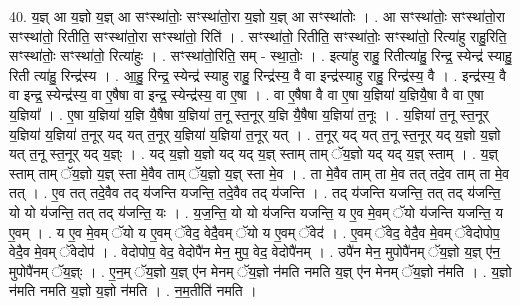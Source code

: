 \documentclass[17pt]{extarticle}
\begin{document}
40. य॒ज्ञ् आ य॒ज्ञो य॒ज्ञ् आ सꣳस्था॑तोः॒ सꣳस्था॑तो॒रा य॒ज्ञो य॒ज्ञ् आ सꣳस्था॑तोः । . आ सꣳस्था॑तोः॒ सꣳस्था॑तो॒रा सꣳस्था॑तो॒ रितीति॒ सꣳस्था॑तो॒रा सꣳस्था॑तो॒ रिति॑ । . सꣳस्था॑तो॒ रितीति॒ सꣳस्था॑तोः॒ सꣳस्था॑तो॒ रित्या॑हु राहु॒रिति॒ सꣳस्था॑तोः॒ सꣳस्था॑तो॒ रित्या॑हुः । . सꣳस्था॑तो॒रिति॒ सम् - स्था॒तोः॒ । . इत्या॑हु राहु॒ रितीत्या॑हु॒ रिन्द्र॒ स्येन्द्र॑ स्याहु॒ रिती त्या॑हु॒ रिन्द्र॑स्य । . आ॒हु॒ रिन्द्र॒ स्येन्द्र॑ स्याहु राहु॒ रिन्द्र॑स्य॒ वै वा इन्द्र॑स्याहु राहु॒ रिन्द्र॑स्य॒ वै । . इन्द्र॑स्य॒ वै वा इन्द्र॒ स्येन्द्र॑स्य॒ वा ए॒षैषा वा इन्द्र॒ स्येन्द्र॑स्य॒ वा ए॒षा । . वा ए॒षैषा वै वा ए॒षा य॒ज्ञिया॑ य॒ज्ञियै॒षा वै वा ए॒षा य॒ज्ञिया᳚ । . ए॒षा य॒ज्ञिया॑ य॒ज्ञि यै॒षैषा य॒ज्ञिया॑ त॒नू स्त॒नूर् य॒ज्ञि यै॒षैषा य॒ज्ञिया॑ त॒नूः । . य॒ज्ञिया॑ त॒नू स्त॒नूर् य॒ज्ञिया॑ य॒ज्ञिया॑ त॒नूर् यद् यत् त॒नूर् य॒ज्ञिया॑ य॒ज्ञिया॑ त॒नूर् यत् । . त॒नूर् यद् यत् त॒नू स्त॒नूर् यद् य॒ज्ञो य॒ज्ञो यत् त॒नू स्त॒नूर् यद् य॒ज्ञ्ः । . यद् य॒ज्ञो य॒ज्ञो यद् यद् य॒ज्ञ् स्ताम् ताम् ॅय॒ज्ञो यद् यद् य॒ज्ञ् स्ताम् । . य॒ज्ञ् स्ताम् ताम् ॅय॒ज्ञो य॒ज्ञ् स्ता मे॒वैव ताम् ॅय॒ज्ञो य॒ज्ञ् स्ता मे॒व । . ता मे॒वैव ताम् ता मे॒व तत् तदे॒व ताम् ता मे॒व तत् । . ए॒व तत् तदे॒वैव तद् य॑जन्ति यजन्ति॒ तदे॒वैव तद् य॑जन्ति । . तद् य॑जन्ति यजन्ति॒ तत् तद् य॑जन्ति॒ यो यो य॑जन्ति॒ तत् तद् य॑जन्ति॒ यः । . य॒ज॒न्ति॒ यो यो य॑जन्ति यजन्ति॒ य ए॒व मे॒वम् ॅयो य॑जन्ति यजन्ति॒ य ए॒वम् । . य ए॒व मे॒वम् ॅयो य ए॒वम् ॅवेद॒ वेदै॒वम् ॅयो य ए॒वम् ॅवेद॑ । . ए॒वम् ॅवेद॒ वेदै॒व मे॒वम् ॅवेदोपोप॒ वेदै॒व मे॒वम् ॅवेदोप॑ । . वेदोपोप॒ वेद॒ वेदोपै॑न मेन॒ मुप॒ वेद॒ वेदोपै॑नम् । . उपै॑न मेन॒ मुपोपै॑नम् ॅय॒ज्ञो य॒ज्ञ् ए॑न॒ मुपोपै॑नम् ॅय॒ज्ञ्ः । . ए॒न॒म् ॅय॒ज्ञो य॒ज्ञ् ए॑न मेनम् ॅय॒ज्ञो न॑मति नमति य॒ज्ञ् ए॑न मेनम् ॅय॒ज्ञो न॑मति । . य॒ज्ञो न॑मति नमति य॒ज्ञो य॒ज्ञो न॑मति । . न॒म॒तीति॑ नमति । \newline
\pagebreak
{}
\end{document}
